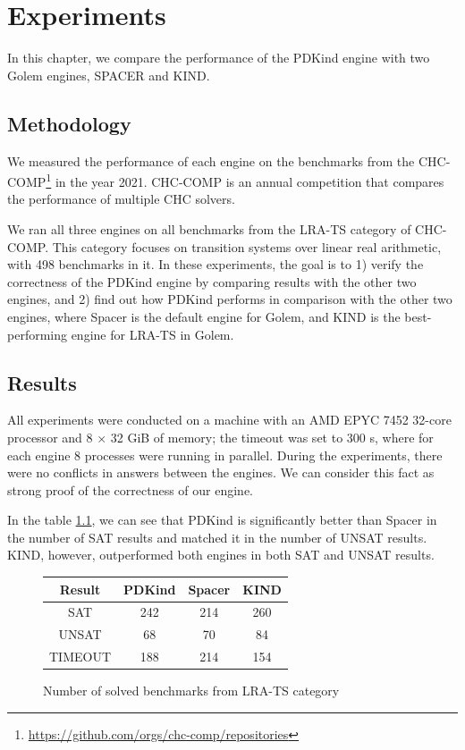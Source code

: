 \chapter{Experiments}
\noindent In this chapter, we compare the performance of the PDKind engine with two Golem engines, SPACER and KIND.

\section{Methodology}
\noindent We measured the performance of each engine on the benchmarks from the CHC-COMP\footnote{\url{https://github.com/orgs/chc-comp/repositories}} in the year 2021. CHC-COMP is an annual competition that compares the performance of multiple CHC solvers.

We ran all three engines on all benchmarks from the LRA-TS category of CHC-COMP. This category focuses on transition systems over linear real arithmetic, with 498 benchmarks in it. In these experiments, the goal is to 1) verify the correctness of the PDKind engine by comparing results with the other two engines, and 2) find out how PDKind performs in comparison with the other two engines, where Spacer is the default engine for Golem, and KIND is the best-performing engine for LRA-TS in Golem.

\section{Results}
\noindent All experiments were conducted on a machine with an AMD EPYC 7452 32-core processor and 8 × 32 GiB of memory; the timeout was set to 300 s, where for each engine 8 processes were running in parallel. During the experiments, there were no conflicts in answers between the engines. We can consider this fact as strong proof of the correctness of our engine.

In the table \ref{tab:results}, we can see that PDKind is significantly better than Spacer in the number of SAT results and matched it in the number of UNSAT results. KIND, however, outperformed both engines in both SAT and UNSAT results.

\renewcommand{\figurename}{Table}
\begin{figure}[H]
\centering
\begin{tabular}{|c|c|c|c|}
\hline
Result & PDKind & Spacer & KIND \\
\hline
SAT & 242 & 214 & 260 \\
\hline
UNSAT & 68 & 70 & 84 \\
\hline
TIMEOUT & 188 & 214 & 154 \\
\hline
\end{tabular}
\caption{Number of solved benchmarks from LRA-TS category} %
\label{tab:results}
\end{figure}

